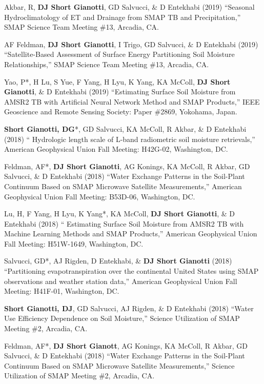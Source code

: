 \documentclass[10pt, a4paper]{article}
\newcommand{\lbr}{\vspace*{12pt}}
\newcommand{\years}[1]{\mbox{}\marginnote{\scriptsize #1}} %
\begin{document}
\years{2019}Akbar, R, \textbf{DJ Short Gianotti}, GD Salvucci, \& D Entekhabi (2019) ``Seasonal Hydroclimatology of ET and Drainage from SMAP TB and Precipitation,'' SMAP Science Team Meeting \#13, Arcadia, CA.\lbr %

\years{2019}AF Feldman, \textbf{DJ Short Gianotti}, I Trigo, GD Salvucci, \& D Entekhabi (2019) ``Satellite-Based Assessment of Surface Energy Partitioning Soil Moisture Relationships,'' SMAP Science Team Meeting \#13, Arcadia, CA.\lbr %
 
\years{2019} Yao, P*, H Lu, S Yue, F Yang, H Lyu, K Yang, KA McColl, \textbf{DJ Short Gianotti}, \& D Entekhabi (2019) ``Estimating Surface Soil Moisture from AMSR2 TB with Artificial Neural Network Method and SMAP Products,'' IEEE Geoscience and Remote Sensing Society: Paper \#2869, Yokohama, Japan.\lbr 
 
\years{2018}\textbf{Short Gianotti, DG}*, GD Salvucci, KA McColl, R Akbar, \& D Entekhabi (2018) `` Hydrologic length scale of L-band radiometric soil moisture retrievals,'' American Geophysical Union Fall Meeting: H42G-02, Washington, DC.\lbr

\years{2018}Feldman, AF*, \textbf{DJ Short Gianotti}, AG Konings, KA McColl, R Akbar, GD Salvucci, \& D Entekhabi (2018) ``Water Exchange Patterns in the Soil-Plant Continuum Based on SMAP Microwave Satellite Measurements,'' American Geophysical Union Fall Meeting: B53D-06, Washington, DC.\lbr

\years{2018}Lu, H, F Yang, H Lyu, K Yang*, KA McColl, \textbf{DJ Short Gianotti}, \& D Entekhabi (2018) `` Estimating Surface Soil Moisture from AMSR2 TB with Machine Learning Methods and SMAP Products,'' American Geophysical Union Fall Meeting: H51W-1649, Washington, DC.\lbr

\years{2018}Salvucci, GD*, AJ Rigden, D Entekhabi, \& \textbf{DJ Short Gianotti} (2018) ``Partitioning evapotranspiration over the continental United States using SMAP observations and weather station data,'' American Geophysical Union Fall Meeting: H41F-01, Washington, DC.\lbr

\years{2018}\textbf{Short Gianotti, DJ}, GD Salvucci, AJ Rigden, \& D Entekhabi (2018) ``Water Use Efficiency Dependence on Soil Moisture,'' Science Utilization of SMAP Meeting \#2, Arcadia, CA.\lbr %

\years{2018}Feldman, AF*, \textbf{DJ Short Gianott}, AG Konings, KA McColl, R Akbar, GD Salvucci, \& D Entekhabi (2018) ``Water Exchange Patterns in the Soil-Plant Continuum Based on SMAP Microwave Satellite Measurements,'' Science Utilization of SMAP Meeting \#2, Arcadia, CA.\lbr %
\end{document}

